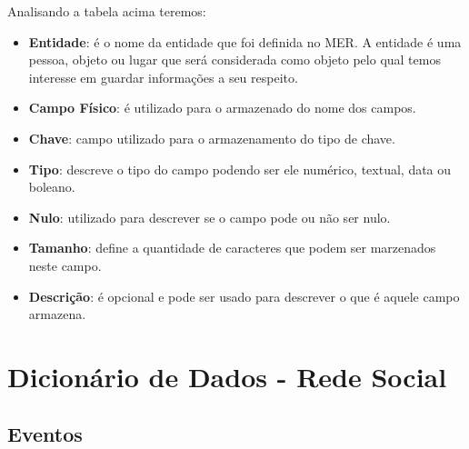 \documentclass[12pt,a4paper]{article}
\begin{document}
Analisando a tabela acima teremos:

\begin{itemize}
\item \textbf{Entidade}: é o nome da entidade que foi definida no MER. A entidade é uma pessoa, objeto ou lugar que será considerada como objeto pelo qual temos interesse em guardar informações a seu respeito.

\item \textbf{Campo Físico}: é utilizado para o armazenado do nome dos campos.

\item \textbf{Chave}: campo utilizado para o armazenamento do tipo de chave.

\item \textbf{Tipo}: descreve o tipo do campo podendo ser ele numérico, textual, data ou boleano.

\item \textbf{Nulo}: utilizado para descrever se o campo pode ou não ser nulo.

\item \textbf{Tamanho}: define a quantidade de caracteres que podem ser marzenados neste campo.

\item \textbf{Descrição}: é opcional e pode ser usado para descrever o que é aquele campo armazena.
\end{itemize}

\newpage
\section{Dicionário de Dados - Rede Social}
\subsection{Eventos}
\end{document}
